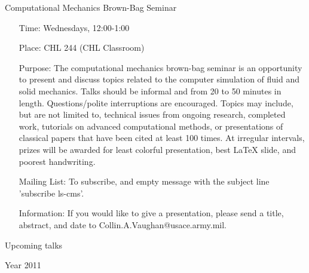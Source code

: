 \documentclass[12]{article}
\begin{document}
\begin{center}
\Large
Computational Mechanics Brown-Bag Seminar
\end{center}

\begin{itemize}
\item[Time:] Wednesdays, 12:00-1:00

\item[Place:] CHL 244 (CHL Classroom)

\item[Purpose:] The computational mechanics brown-bag seminar is an
  opportunity to present and discuss topics related to the computer
  simulation of fluid and solid mechanics. Talks should be informal
  and from 20 to 50 minutes in length. Questions/polite interruptions
  are encouraged. Topics may include, but are not limited to,
  technical issues from ongoing research, completed work, tutorials on
  advanced computational methods, or presentations of classical papers
  that have been cited at least 100 times.  At irregular intervals,
  prizes will be awarded for least colorful presentation, best \LaTeX
  slide, and poorest handwriting.

\item[Mailing List:] To subscribe,  and empty message with the subject line 'subscribe ls-cms'.

\item[Information:] If you would like to give a presentation, please send a title, abstract, and date to Collin.A.Vaughan@usace.army.mil.


\end{itemize}


\begin{center}
\Large
Upcoming talks
\end{center}

\begin{center}
\Large
Year 2011
\end{center}
\end{document}
